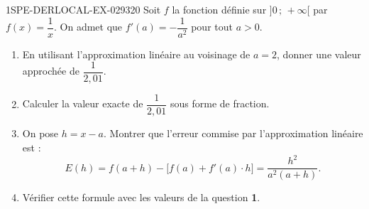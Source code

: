 \begin{exercice}{1SPE-DERLOCAL-EX-029}{3}{20}
Soit $f$ la fonction définie sur $]0\,;\,+\infty[$ par $f(x) = \dfrac{1}{x}$. On admet que $f'(a) = -\dfrac{1}{a^2}$ pour tout $a > 0$.

\begin{enumerate}
  \item En utilisant l'approximation linéaire au voisinage de $a = 2$, donner une valeur approchée de $\dfrac{1}{2{,}01}$.
  \item Calculer la valeur exacte de $\dfrac{1}{2{,}01}$ sous forme de fraction.
  \item On pose $h = x - a$. Montrer que l'erreur commise par l'approximation linéaire est :
  \[
  E(h) = f(a+h) - \bigl[f(a) + f'(a) \cdot h\bigr] = \dfrac{h^2}{a^2(a+h)}.
  \]
  \item Vérifier cette formule avec les valeurs de la question \textbf{1}.
\end{enumerate}
\end{exercice}
